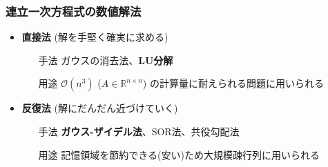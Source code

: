 \documentclass[dvipdfmx,aspectratio=169,20pt]{beamer}
\newcommand{\myfontsetting}[3]{{\fontsize{#1}{#2}\selectfont #3}}
\begin{document}
\begin{frame}
\frametitle{{\large 連立一次方程式の数値解法}}

\begin{itemize}
    \setlength{\itemsep}{0.5cm}
    \item {\bf 直接法} \myfontsetting{12pt}{12pt}{(解を手堅く確実に求める)}
    \begin{itemize}
        \item [手法] ガウスの消去法、{\bf LU分解}
        \item [用途] $\mathcal{O}(n^3)$ \myfontsetting{12pt}{12pt}{($A\in \mathbb{R}^{n\times n}$)} の計算量に耐えられる問題に用いられる
    \end{itemize}
    \item {\bf 反復法} \myfontsetting{12pt}{12pt}{(解にだんだん近づけていく)}
    \begin{itemize}
        \item [手法] {\bf ガウス-ザイデル法}、SOR法、共役勾配法%
        \item [用途] 記憶領域を節約できる\myfontsetting{12pt}{12pt}{(安い)}ため大規模疎行列に用いられる
    \end{itemize}
\end{itemize}

\vspace{-2mm}

\end{frame}
\end{document}
